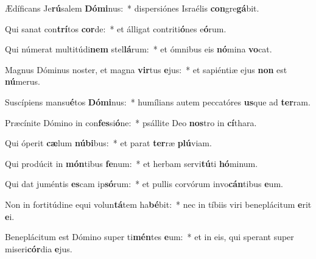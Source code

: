 \item Ædíficans Je\textbf{rú}salem \textbf{Dó}\textbf{mi}nus:~* dispersiónes Israélis \textbf{con}gre\textbf{gá}bit.
\item Qui sanat con\textbf{trí}tos \textbf{cor}de:~* et álligat contriti\textbf{ó}nes e\textbf{ó}rum.
\item Qui númerat multitúdi\textbf{nem} stel\textbf{lá}rum:~* et ómnibus eis \textbf{nó}mina \textbf{vo}cat.
\item Magnus Dóminus noster, et magna \textbf{vir}tus \textbf{e}jus:~* et sapiéntiæ ejus \textbf{non} est \textbf{nú}merus.
\item Suscípiens mansu\textbf{é}tos \textbf{Dó}\textbf{mi}nus:~* humílians autem peccatóres \textbf{us}que ad \textbf{ter}ram.
\item Præcínite Dómino in con\textbf{fes}si\textbf{ó}ne:~* psállite Deo \textbf{nos}tro in \textbf{cí}thara.
\item Qui óperit \textbf{cæ}lum \textbf{nú}\textbf{bi}bus:~* et parat \textbf{ter}ræ \textbf{plú}viam.
\item Qui prodúcit in \textbf{món}tibus \textbf{fe}num:~* et herbam servi\textbf{tú}ti \textbf{hó}minum.
\item Qui dat juméntis \textbf{es}cam ip\textbf{só}rum:~* et pullis corvórum invo\textbf{cán}tibus \textbf{e}um.
\item Non in fortitúdine equi volun\textbf{tá}tem ha\textbf{bé}bit:~* nec in tíbiis viri beneplácitum \textbf{e}rit \textbf{e}i.
\item Beneplácitum est Dómino super ti\textbf{mén}tes \textbf{e}um:~* et in eis, qui sperant super miseri\textbf{cór}dia \textbf{e}jus.
